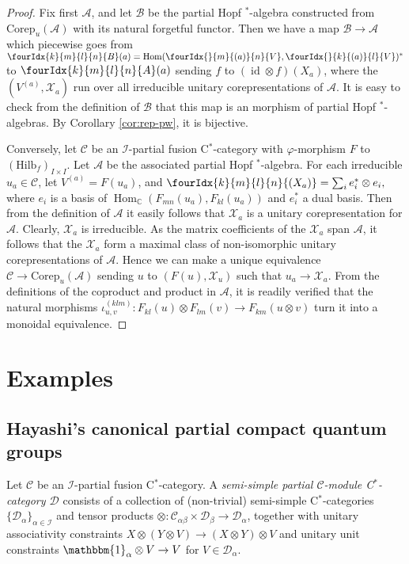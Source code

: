 \documentclass[10pt]{article}
\DeclareMathOperator{\id}{id}
\DeclareMathOperator{\Hom}{Hom}
\newcommand{\Corep}{\mathrm{Corep}}
\newcommand{\C}{\mathbb{C}}
\newcommand{\CatC}{\mathcal{C}}
\newcommand{\CatD}{\mathcal{D}}
\newcommand{\CatCC}{\mathscr{C}}
\newcommand{\CatDD}{\mathscr{D}}
\newcommand{\Hilb}{\mathrm{Hilb}}
\newcommand{\Gr}[5]{\fourIdx{#2}{#4}{#3}{#5}{#1}}%
\theoremstyle{definition}
\numberwithin{equation}{section}
\begin{document}
\begin{proof} Fix first $\mathscr{A}$, and let $\mathscr{B}$ be the
  partial Hopf $^*$-algebra constructed from $\Corep_u(\mathscr{A})$
  with its natural forgetful functor. Then we have a map $\mathscr{B}
  \rightarrow \mathscr{A}$ which piecewise goes from
  $\Gr{B}{k}{l}{m}{n}(a) =
  \Hom(\Gr{V}{}{(a)}{m}{n},\Gr{V}{}{(a)}{k}{l})^*$ to
  $\Gr{A}{k}{l}{m}{n}(a)$ sending $f$ to $(\id\otimes f)(X_a)$, where
  the $(V^{(a)},\mathscr{X}_a)$ run over all irreducible unitary
  corepresentations of $\mathscr{A}$. It is easy to check from the
  definition of $\mathscr{B}$ that this map is an morphism of partial
  Hopf $^*$-algebras.  By Corollary \ref{cor:rep-pw}, it is 
  bijective.

Conversely, let $\CatCC$ be an $\mathscr{I}$-partial fusion C$^*$-category with $\varphi$-morphism $F$ to $(\Hilb_f)_{I\times I}$. Let $\mathscr{A}$ be the associated partial Hopf $^*$-algebra. For each irreducible $u_a \in \CatCC$, let $V^{(a)} = F(u_a)$, and $\Gr{(X_a)}{k}{l}{m}{n} = \sum_i e_i^*\otimes e_i,$ where $e_i$ is a basis of $\Hom_{\C}(F_{mn}(u_{a}),F_{kl}(u_{a}))$ and $e_i^*$ a dual basis. Then from the definition of $\mathscr{A}$ it easily follows that $\mathscr{X}_a$ is a unitary corepresentation for $\mathscr{A}$. Clearly, $\mathscr{X}_a$ is irreducible. As the matrix coefficients of the $\mathscr{X}_a$ span $\mathscr{A}$, it follows that the $\mathscr{X}_a$ form a maximal class of non-isomorphic unitary corepresentations of $\mathscr{A}$. Hence we can make a unique equivalence $\CatCC\rightarrow \Corep_u(\mathscr{A})$ sending $u$ to $(F(u),\mathscr{X}_u)$ such that $u_a\rightarrow \mathscr{X}_a$. From the definitions of the coproduct and product in $\mathscr{A}$, it is readily verified that the natural morphisms $\iota^{(klm)}_{u,v}:F_{kl}(u)\otimes F_{lm}(v)\rightarrow F_{km}(u\otimes v)$ turn it into a monoidal equivalence. 
\end{proof}


\section{Examples}

\subsection{Hayashi's canonical partial compact quantum groups} \label{SubSecCan}

Let $\CatCC$ be an $\mathscr{I}$-partial fusion C$^*$-category. A \emph{semi-simple partial $\CatCC$-module C$^*$-category $\CatDD$} consists of a collection of (non-trivial) semi-simple C$^*$-categories $\{\CatD_{\alpha}\}_{\alpha\in \mathscr{I}}$ and  tensor products $\otimes: \CatC_{\alpha\beta}\times \CatD_{\beta}\rightarrow \CatD_{\alpha}$, together with unitary associativity constraints $X\otimes (Y\otimes V)\rightarrow (X\otimes Y)\otimes V$ and unitary unit constraints $\mathbbm{1}_{\alpha} \otimes V \rightarrow V$ for $V\in \CatD_{\alpha}$.
\end{document}
